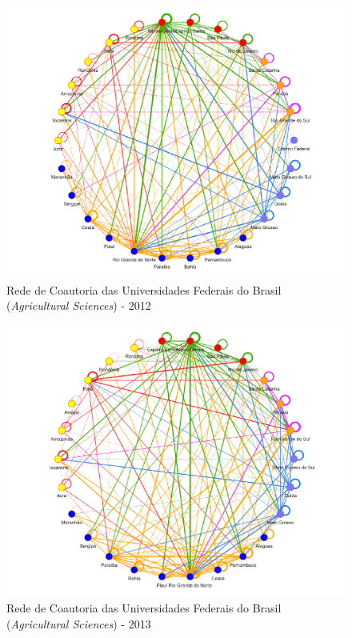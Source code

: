 \begin{figure}[H]
	\centering
	\includegraphics[scale=0.6]{Imagens/rede-agr-br-2012.pdf}
	\caption{Rede de Coautoria das Universidades Federais do Brasil (\textit{Agricultural Sciences}) - 2012}
	\label{Rede de Coautoria - UF AGRI BR 2012}
\end{figure}

\begin{figure}[H]
	\centering
	\includegraphics[scale=0.6]{Imagens/rede-agr-br-2013.pdf}
	\caption{Rede de Coautoria das Universidades Federais do Brasil (\textit{Agricultural Sciences}) - 2013}
	\label{Rede de Coautoria - UF AGRI BR 2013}
\end{figure}

